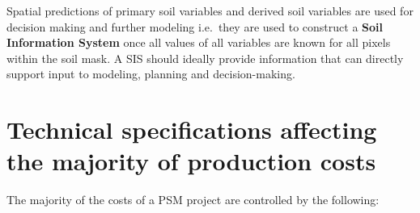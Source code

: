 \documentclass[graybox,natbib,nospthms,UStrade]{svmono}
\begin{document}
Spatial predictions of primary soil variables and derived soil variables
are used for decision making and further modeling i.e.~they are used to
construct a \textbf{Soil Information System} once all values of all variables
are known for all pixels within the soil mask. A SIS should ideally
provide information that can directly support input to modeling,
planning and decision-making.

\hypertarget{technical-specifications-affecting-the-majority-of-production-costs}{%
\section{Technical specifications affecting the majority of production costs}\label{technical-specifications-affecting-the-majority-of-production-costs}}

The majority of the costs of a PSM project are controlled by the following:
\end{document}
